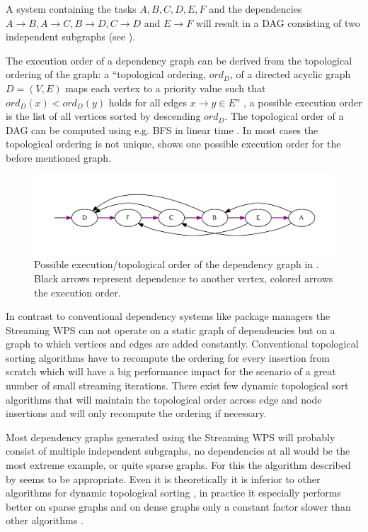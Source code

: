 		A system containing the tasks $A, B, C, D, E, F$ and the dependencies $A\rightarrow B, A\rightarrow C, B\rightarrow D, C\rightarrow D$ and $E\rightarrow F$ will result in a \ac{DAG} consisting of two independent subgraphs (see ).

		The execution order of a dependency graph can be derived from the topological ordering of the graph: a ``topological ordering, $ord_D$, of a directed acyclic graph $D = (V, E)$ maps each vertex to a priority value such that $ord_{D}(x) < ord_{D}(y)$ holds for all edges $x \rightarrow y \in E$'' \citep{pearce2007dynamic}, a possible execution order is the list of all vertices sorted by descending $ord_D$. The topological order of a \ac{DAG} can be computed using e.g. \ac{BFS} in linear time \citep{cormen2001introduction}. In most cases the topological ordering is not unique,  shows one possible execution order for the before mentioned graph.

		\begin{figure}[!htb]
			\centering
			\includegraphics[width=1\textwidth]{figures/ordered-graph.pdf} %
			\caption{\label{fig:graph:ordered}Possible execution/topological order of the dependency graph in . Black arrows represent dependence to another vertex, colored arrows the execution order.}
		\end{figure}

		In contrast to conventional dependency systems like package managers the Streaming \ac{WPS} can not operate on a static graph of dependencies but on a graph to which vertices and edges are added constantly. Conventional topological sorting algorithms have to recompute the ordering for every insertion from scratch which will have a big performance impact for the scenario of a great number of small streaming iterations. There exist few dynamic topological sort algorithms that will maintain the topological order across edge and node insertions and will only recompute the ordering if necessary.

		Most dependency graphs generated using the Streaming \ac{WPS} will probably consist of multiple independent subgraphs, no dependencies at all would be the most extreme example, or quite sparse graphs. For this the algorithm described by \citet{pearce2007dynamic} seems to be appropriate. Even it is theoretically it is inferior to other algorithms for dynamic topological sorting \citep[e.g. ][]{alpern1990incremental,marchetti1996maintaining}, in practice it especially performs better on sparse graphs and on dense graphs only a constant factor slower than other algorithms \citep{pearce2007dynamic}. %

